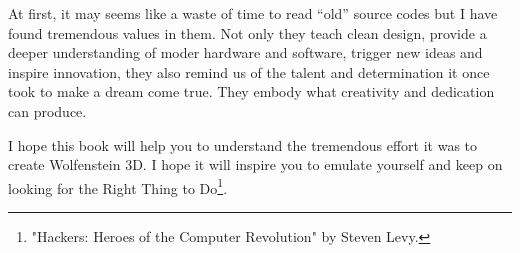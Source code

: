 \documentclass[book.tex]{subfiles}
\begin{document}
\bigskip

At first, it may seems like a waste of time to read ``old'' source codes but I have found  tremendous values in them. Not only they teach clean design, provide a deeper understanding of moder hardware and software, trigger new ideas and inspire innovation, they also remind us of the talent and determination it once took to make a dream come true. They embody what creativity and dedication can produce.

\bigskip

I hope this book will help you to understand the tremendous effort it was to create Wolfenstein 3D. I hope it will inspire you to emulate yourself and keep on looking for the Right Thing to Do\footnote{"Hackers: Heroes of the Computer Revolution" by Steven Levy.}.
\end{document}
